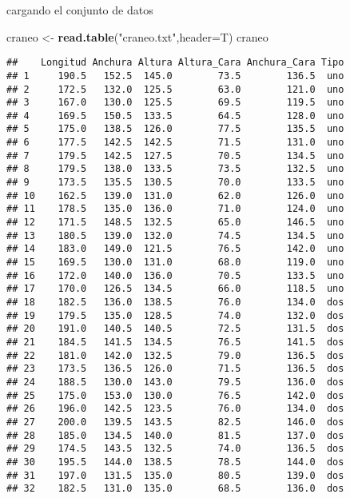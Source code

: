 \documentclass[ignorenonframetext,]{beamer}
\newenvironment{Shaded}{\begin{snugshade}}{\end{snugshade}}
\newcommand{\KeywordTok}[1]{\textcolor[rgb]{0.13,0.29,0.53}{\textbf{#1}}}
\newcommand{\DataTypeTok}[1]{\textcolor[rgb]{0.13,0.29,0.53}{#1}}
\newcommand{\StringTok}[1]{\textcolor[rgb]{0.31,0.60,0.02}{#1}}
\newcommand{\NormalTok}[1]{#1}
\begin{document}
\begin{frame}[fragile]{cargando el conjunto de datos}

\begin{Shaded}
\begin{Highlighting}[]
\NormalTok{craneo <-}\StringTok{ }\KeywordTok{read.table}\NormalTok{(}\StringTok{"craneo.txt"}\NormalTok{,}\DataTypeTok{header=}\NormalTok{T)}
\NormalTok{craneo}
\end{Highlighting}
\end{Shaded}

\begin{verbatim}
##    Longitud Anchura Altura Altura_Cara Anchura_Cara Tipo
## 1     190.5   152.5  145.0        73.5        136.5  uno
## 2     172.5   132.0  125.5        63.0        121.0  uno
## 3     167.0   130.0  125.5        69.5        119.5  uno
## 4     169.5   150.5  133.5        64.5        128.0  uno
## 5     175.0   138.5  126.0        77.5        135.5  uno
## 6     177.5   142.5  142.5        71.5        131.0  uno
## 7     179.5   142.5  127.5        70.5        134.5  uno
## 8     179.5   138.0  133.5        73.5        132.5  uno
## 9     173.5   135.5  130.5        70.0        133.5  uno
## 10    162.5   139.0  131.0        62.0        126.0  uno
## 11    178.5   135.0  136.0        71.0        124.0  uno
## 12    171.5   148.5  132.5        65.0        146.5  uno
## 13    180.5   139.0  132.0        74.5        134.5  uno
## 14    183.0   149.0  121.5        76.5        142.0  uno
## 15    169.5   130.0  131.0        68.0        119.0  uno
## 16    172.0   140.0  136.0        70.5        133.5  uno
## 17    170.0   126.5  134.5        66.0        118.5  uno
## 18    182.5   136.0  138.5        76.0        134.0  dos
## 19    179.5   135.0  128.5        74.0        132.0  dos
## 20    191.0   140.5  140.5        72.5        131.5  dos
## 21    184.5   141.5  134.5        76.5        141.5  dos
## 22    181.0   142.0  132.5        79.0        136.5  dos
## 23    173.5   136.5  126.0        71.5        136.5  dos
## 24    188.5   130.0  143.0        79.5        136.0  dos
## 25    175.0   153.0  130.0        76.5        142.0  dos
## 26    196.0   142.5  123.5        76.0        134.0  dos
## 27    200.0   139.5  143.5        82.5        146.0  dos
## 28    185.0   134.5  140.0        81.5        137.0  dos
## 29    174.5   143.5  132.5        74.0        136.5  dos
## 30    195.5   144.0  138.5        78.5        144.0  dos
## 31    197.0   131.5  135.0        80.5        139.0  dos
## 32    182.5   131.0  135.0        68.5        136.0  dos
\end{verbatim}

\end{frame}
\end{document}
